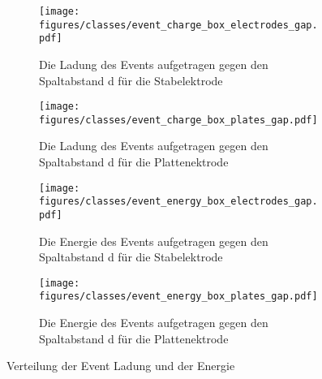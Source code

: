 \begin{figure}[H]
  \centering
  \begin{subfigure}[t]{0.48\textwidth}
    \centering
    \texttt{[image: figures/classes/event\_charge\_box\_electrodes\_gap.pdf]}
    \caption{Die Ladung des Events aufgetragen gegen den Spaltabstand d für die Stabelektrode}
    \label{fig:box-gap-eventcharge-stab}
  \end{subfigure}
  \begin{subfigure}[t]{0.48\textwidth}
    \centering
    \texttt{[image: figures/classes/event\_charge\_box\_plates\_gap.pdf]}
    \caption{Die Ladung des Events aufgetragen gegen den Spaltabstand d für die Plattenektrode}
    \label{fig:box-gap-event-charge-plate}
  \end{subfigure}
  \centering
  \begin{subfigure}[t]{0.48\textwidth}
    \centering
    \texttt{[image: figures/classes/event\_energy\_box\_electrodes\_gap.pdf]}
    \caption{Die Energie des Events aufgetragen gegen den Spaltabstand d für die Stabelektrode}
    \label{fig:box-gap-event-energy-stab}
  \end{subfigure}
  \begin{subfigure}[t]{0.48\textwidth}
    \centering
    \texttt{[image: figures/classes/event\_energy\_box\_plates\_gap.pdf]}
    \caption{Die Energie des Events aufgetragen gegen den Spaltabstand d für die Plattenektrode}
    \label{fig:box-gap-event-energy-plate}
  \end{subfigure}
  \caption{Verteilung der Event Ladung und der Energie}
  \label{fig:box-gap-event-charge-energy}
\end{figure}

